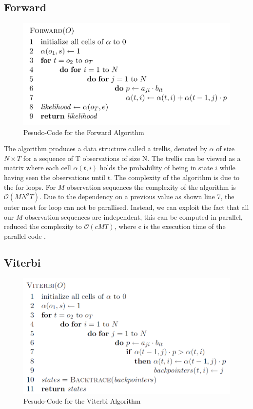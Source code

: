 \documentclass[english, paper=a4]{scrartcl}
\begin{document}
\subsection{Forward}

\begin{figure}[H]

\centering
\includegraphics[scale=0.4]{"FW"}
 \caption{Pesudo-Code for the Forward Algorithm \cite{cuhmm}}

\end{figure}

The algorithm produces a data structure called a trellis, denoted by \(\alpha\) of size \(N \times T \) for a sequence of T observations of size N. The trellis can be viewed as a matrix where each cell \(\alpha(t,i)\) holds the probability of being in state \(i\) while having seen the observations until \(t\). The complexity of the algorithm is due to the for loops. For \(M\) observation sequences the complexity of the algorithm is 
$\mathcal{O}(MN^2T)$. Due to the dependency on a previous value as shown line 7, the outer most for loop can not be parallised. Instead, we can exploit the fact that all our \(M\) observation sequences are independent, this can be computed in parallel, reduced the complexity to $\mathcal{O}(cMT)$, where c is the execution time of the parallel code \cite{cuhmm}.
\subsection{Viterbi}

\begin{figure}[H]

\centering
\includegraphics[scale=0.4]{"vit"}
 \caption{Pesudo-Code for the Viterbi Algorithm \cite{cuhmm}}

\end{figure}
\end{document}
